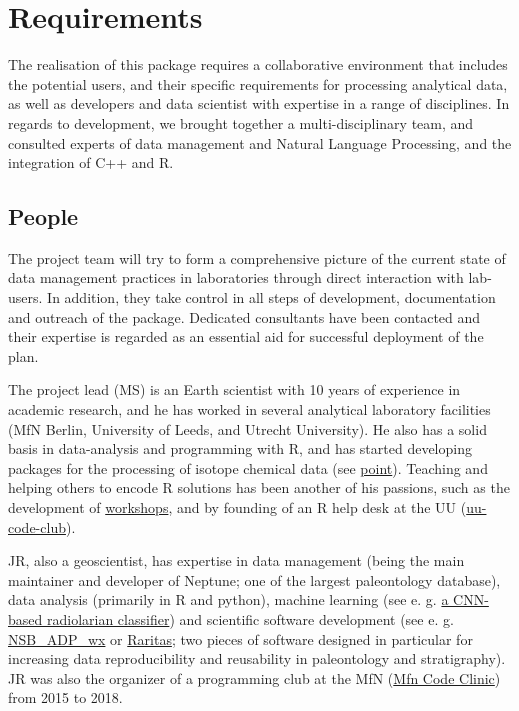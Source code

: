 \documentclass[]{article}
\begin{document}
\hypertarget{requirements}{%
\section{Requirements}\label{requirements}}

The realisation of this package requires a collaborative environment that includes the potential users, and their specific requirements for processing analytical data, as well as developers and data scientist with expertise in a range of disciplines. In regards to development, we brought together a multi-disciplinary team, and consulted experts of data management and Natural Language Processing, and the integration of C++ and R.

\hypertarget{people}{%
\subsection{People}\label{people}}

The project team will try to form a comprehensive picture of the current state of data management practices in laboratories through direct interaction with lab-users. In addition, they take control in all steps of development, documentation and outreach of the package. Dedicated consultants have been contacted and their expertise is regarded as an essential aid for successful deployment of the plan.

The project lead (MS) is an Earth scientist with 10 years of experience in academic research, and he has worked in several analytical laboratory facilities (MfN Berlin, University of Leeds, and Utrecht University). He also has a solid basis in data-analysis and programming with R, and has started developing packages for the processing of isotope chemical data (see \href{https://martinschobben.github.io/point/}{point}). Teaching and helping others to encode R solutions has been another of his passions, such as the development of \href{https://www.youtube.com/watch?v=r99jsChi4HU}{workshops}, and by founding of an R help desk at the UU (\href{https://github.com/uu-code-club}{uu-code-club}).

JR, also a geoscientist, has expertise in data management (being the main maintainer and developer of Neptune; one of the largest paleontology database), data analysis (primarily in R and python), machine learning (see e. g. \href{https://github.com/plannapus/RadiolarianClassifier}{a CNN-based radiolarian classifier}) and scientific software development (see e. g. \href{http://github.com/plannapus/NSB_ADP_wx}{NSB\_ADP\_wx} or \href{http://github.com/plannapus/Raritas}{Raritas}; two pieces of software designed in particular for increasing data reproducibility and reusability in paleontology and stratigraphy). JR was also the organizer of a programming club at the MfN (\href{http://github.com/plannapus/MfN-Code-Clinic}{Mfn Code Clinic}) from 2015 to 2018.
\end{document}
